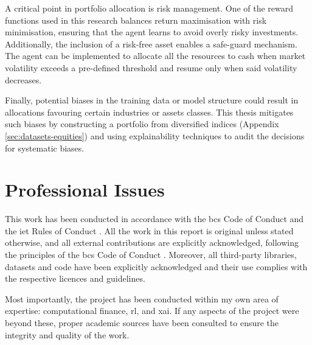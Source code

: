 A critical point in portfolio allocation is risk management. One of the reward functions used in this research balances return maximisation with risk minimisation, ensuring that the agent learns to avoid overly risky investments. Additionally, the inclusion of a risk-free asset enables a safe-guard mechanism. The agent can be implemented to allocate all the resources to cash when market volatility exceeds a pre-defined threshold and resume only when said volatility decreases.

Finally, potential biases in the training data or model structure could result in allocations favouring certain industries or assets classes. This thesis mitigates such biases by constructing a portfolio from diversified indices (Appendix \ref{sec:datasets-equities}) and using explainability techniques to audit the decisions for systematic biases.

\section{Professional Issues} \label{sec:professional-issues}

This work has been conducted in accordance with the \acrfull{bcs} Code of Conduct \cite{BCSCodeConduct} and the \acrfull{iet} Rules of Conduct \cite{IETRules}. All the work in this report is original unless stated otherwise, and all external contributions are explicitly acknowledged, following the principles of the \acrshort{bcs} Code of Conduct \cite{BCSCodeConduct}. Moreover, all third-party libraries, datasets and code have been explicitly acknowledged and their use complies with the respective licences and guidelines.

Most importantly, the project has been conducted within my own area of expertise: computational finance, \acrlong{rl}, and \acrlong{xai}. If any aspects of the project were beyond these, proper academic sources have been consulted to ensure the integrity and quality of the work. 
